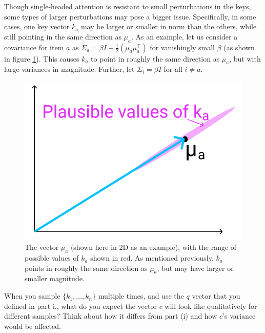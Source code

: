 \begin{parts}
\begin{subparts}
\subpart[3] Though single-headed attention is resistant to small perturbations in the keys, some types of larger perturbations may pose a bigger issue. Specifically, in some cases, one key vector $k_a$ may be larger or smaller in norm than the others, while still pointing in the same direction as $\mu_a$. As an example, let us consider a covariance for item $a$ as $\Sigma_a = \beta I + \frac{1}{2}(\mu_a\mu_a^\top)$ for vanishingly small $\beta$ (as shown in figure \ref{ka_plausible}). This causes $k_a$ to point in roughly the same direction as $\mu_a$, but with large variances in magnitude. Further, let $\Sigma_i = \beta I$ for all $i \neq a$.
\begin{figure}[h]
\centering
\captionsetup{justification=centering,margin=2cm}
\includegraphics[width=0.35\linewidth]{images/ka_plausible.png}
\caption{The vector $\mu_a$ (shown here in 2D as an example), with the range of possible values of $k_a$ shown in red. As mentioned previously, $k_a$ points in roughly the same direction as $\mu_a$, but may have larger or smaller magnitude.}
\label{ka_plausible}
\end{figure}

When you sample $\{k_1,\dots,k_n\}$ multiple times, and use the $q$ vector that you defined in part i., what do you expect the vector $c$ will look like qualitatively for different samples? Think about how it differs from part (i) and how $c$'s variance would be affected.

\end{subparts}
\end{parts}
